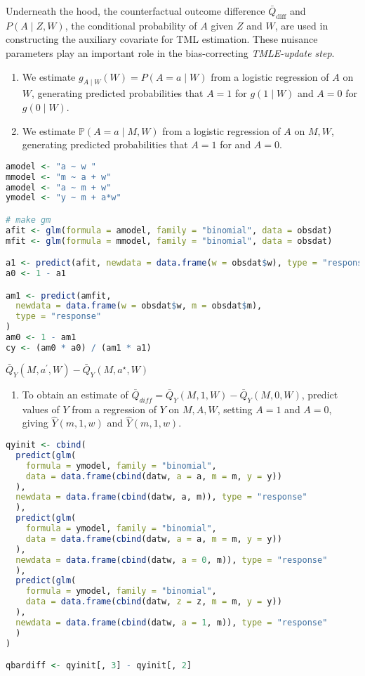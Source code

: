 \documentclass[
  12pt, krantz2,
]{book}
\providecommand{\tightlist}{%
  \setlength{\itemsep}{0pt}\setlength{\parskip}{0pt}}
\theoremstyle{definition}
\theoremstyle{definition}
\theoremstyle{definition}
\renewcommand{\P}{\mathbb{P}}
\newcommand{\1}{\mathbbm{1}}
\begin{document}
Underneath the hood, the counterfactual outcome difference
\(\bar{Q}_{\text{diff}}\) and \(P(A \mid Z, W)\), the conditional probability of \(A\)
given \(Z\) and \(W\), are used in constructing the auxiliary covariate for TML
estimation. These nuisance parameters play an important role in the
bias-correcting \emph{TMLE-update step}.

\begin{enumerate}
\def\labelenumi{\arabic{enumi}.}
\tightlist
\item
  We estimate \(g_{A \mid W}(W)=P(A=a \mid W)\) from a logistic regression of
  \(A\) on \(W\), generating predicted probabilities that \(A=1\) for \(g(1 \mid W)\)
  and \(A=0\) for \(g(0 \mid W)\).\\
\item
  We estimate \(\P(A=a \mid M, W)\) from a logistic regression of \(A\) on \(M, W\),
  generating predicted probabilities that \(A=1\) for and \(A=0\).
\end{enumerate}

\begin{lstlisting}[language=R]
amodel <- "a ~ w "
mmodel <- "m ~ a + w"
amodel <- "a ~ m + w"
ymodel <- "y ~ m + a*w"

# make gm
afit <- glm(formula = amodel, family = "binomial", data = obsdat)
mfit <- glm(formula = mmodel, family = "binomial", data = obsdat)

a1 <- predict(afit, newdata = data.frame(w = obsdat$w), type = "response")
a0 <- 1 - a1

am1 <- predict(amfit,
  newdata = data.frame(w = obsdat$w, m = obsdat$m),
  type = "response"
)
am0 <- 1 - am1
cy <- (am0 * a0) / (am1 * a1)
\end{lstlisting}

\(\bar{Q}_Y(M,a^\prime,W) - \bar{Q}_Y(M,a^\star,W)\)

\begin{enumerate}
\def\labelenumi{\arabic{enumi}.}
\setcounter{enumi}{2}
\tightlist
\item
  To obtain an estimate of \(\bar{Q}_{diff} = \bar{Q}_Y(M,1,W) - \bar{Q}_Y(M,0,W)\), predict values of \(Y\) from a regression of \(Y\) on \(M,A,W\),
  setting \(A=1\) and \(A=0\), giving \(\hat{Y}(m, 1, w)\) and \(\hat{Y}(m, 1, w)\).
\end{enumerate}

\begin{lstlisting}[language=R]
qyinit <- cbind(
  predict(glm(
    formula = ymodel, family = "binomial",
    data = data.frame(cbind(datw, a = a, m = m, y = y))
  ),
  newdata = data.frame(cbind(datw, a, m)), type = "response"
  ),
  predict(glm(
    formula = ymodel, family = "binomial",
    data = data.frame(cbind(datw, a = a, m = m, y = y))
  ),
  newdata = data.frame(cbind(datw, a = 0, m)), type = "response"
  ),
  predict(glm(
    formula = ymodel, family = "binomial",
    data = data.frame(cbind(datw, z = z, m = m, y = y))
  ),
  newdata = data.frame(cbind(datw, a = 1, m)), type = "response"
  )
)

qbardiff <- qyinit[, 3] - qyinit[, 2]
\end{lstlisting}
\end{document}
